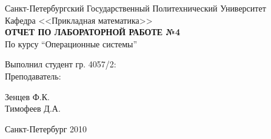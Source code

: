 \begin{titlepage}

\begin{center}

\large Санкт-Петербургский Государственный Политехнический Университет \\
Кафедра <<Прикладная математика>> \\ [8.0cm]
\textbf{\textsc{ОТЧЕТ ПО ЛАБОРАТОРНОЙ РАБОТЕ №4}}\\[1.0cm]
По курсу ``Операционные системы''\\[3.0cm]

\begin{minipage}{0.4\textwidth}
\begin{flushleft} \large
  Выполнил студент гр. 4057/2: \\ [1.0cm]
  Преподаватель:
\end{flushleft}
\end{minipage}
\begin{minipage}{0.4\textwidth}
\begin{flushright} \large
Зенцев Ф.К. \\ [1.0cm]
Тимофеев Д.А.
\end{flushright}
\end{minipage}

\vfill

\large Санкт-Петербург 2010



\end{center}
\end{titlepage}
